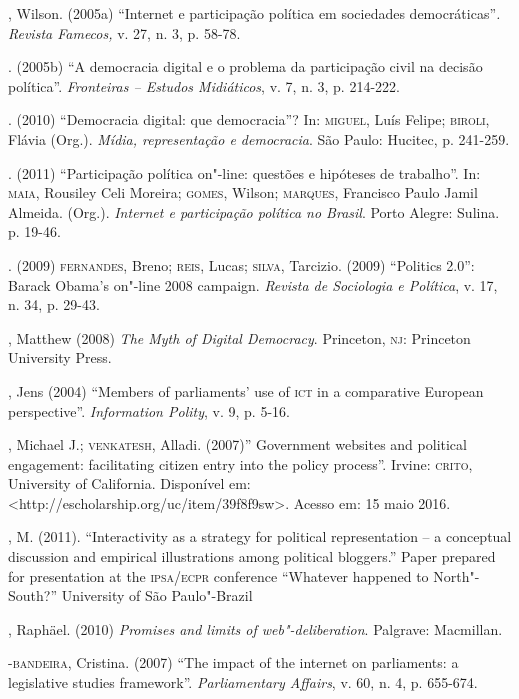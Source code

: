 \begin{bibliohedra}
, Wilson. (2005a) ``Internet e participação política em sociedades
democráticas''\emph{. Revista Famecos,} v. 27, n. 3, p. 58-78.

\titidem. (2005b) ``A democracia digital e o problema da
participação civil na decisão política''. \emph{Fronteiras -- Estudos
Midiáticos}, v. 7, n. 3, p. 214-222.

\titidem. (2010) ``Democracia digital: que democracia''? In:
\textsc{miguel}, Luís Felipe; \textsc{biroli}, Flávia (Org.). \emph{Mídia, representação e
democracia}. São Paulo: Hucitec, p. 241-259.

\titidem. (2011) ``Participação política on"-line: questões e
hipóteses de trabalho''. In: \textsc{maia}, Rousiley Celi Moreira; \textsc{gomes}, Wilson;
\textsc{marques}, Francisco Paulo Jamil Almeida. (Org.). \emph{Internet e
participação política no Brasil}. Porto Alegre: Sulina. p. 19-46.

\titidem. (2009) \textsc{fernandes}, Breno; \textsc{reis}, Lucas; \textsc{silva}, Tarcizio.
(2009) ``Politics 2.0'': Barack Obama's on"-line 2008 campaign.
\emph{Revista de Sociologia e Política}, v. 17, n. 34, p. 29-43.

, Matthew (2008) \emph{The Myth of Digital Democracy}. Princeton,
\textsc{nj}: Princeton University Press.

, Jens (2004) ``Members of parliaments' use of \textsc{ict} in a comparative
European perspective''. \emph{Information Polity}, v. 9, p. 5-16.

, Michael J.; \textsc{venkatesh}, Alladi. (2007)'' Government websites and
political engagement: facilitating citizen entry into the policy
process''. Irvine: \textsc{crito}, University of California. Disponível em:
\textless{}http://escholarship.org/uc/item/39f8f9sw\textgreater{}.
Acesso em: 15 maio 2016.

, M. (2011). ``Interactivity as a strategy for political
representation -- a conceptual discussion and empirical illustrations
among political bloggers.'' Paper prepared for presentation at the
\textsc{ipsa}/\textsc{ecpr} conference ``Whatever happened to North"-South?'' University of
São Paulo"-Brazil

, Raphäel. (2010) \emph{Promises and limits of web"-deliberation}.
Palgrave: Macmillan.

-\textsc{bandeira}, Cristina. (2007) ``The impact of the internet on
parliaments: a legislative studies framework''. \emph{Parliamentary
Affairs}, v. 60, n. 4, p. 655-674.


\end{bibliohedra}
